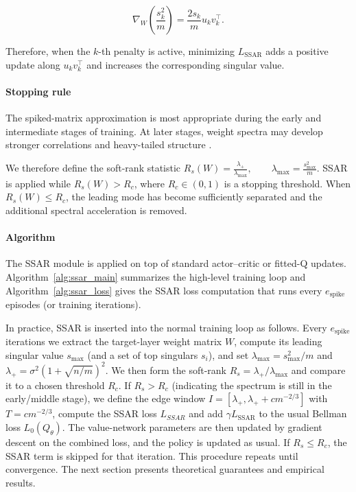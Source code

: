 \begin{equation}
\nabla_W
\left(
\frac{s_k^2}{m}
\right)
=
\frac{2s_k}{m}
u_kv_k^\top.
\end{equation}

Therefore, when the $k$-th penalty is active, minimizing
$L_{\mathrm{SSAR}}$ adds a positive update along $u_kv_k^\top$ and increases
the corresponding singular value.



\paragraph{Stopping rule}
The spiked-matrix approximation is most appropriate during the early and
intermediate stages of training. At later stages, weight spectra may develop
stronger correlations and heavy-tailed structure
\cite{martin2021implicit}.

We therefore define the soft-rank statistic $R_s(W)
=
\frac{\lambda_+}{\lambda_{\max}},
\qquad
\lambda_{\max}
=
\frac{s_{\max}^2}{m}$. SSAR is applied while $R_s(W)>R_c$, where $R_c\in(0,1)$ is a stopping threshold.
When $R_s(W)\leq R_c$, the leading mode has become sufficiently separated and the additional spectral acceleration is removed.

\paragraph{Algorithm}
The SSAR module is applied on top of standard actor–critic or fitted-Q updates. Algorithm~\ref{alg:ssar_main} summarizes the high-level training loop and Algorithm~\ref{alg:ssar_loss} gives the SSAR loss computation that runs every $e_{\mathrm{spike}}$ episodes (or training iterations).


In practice, SSAR is inserted into the normal training loop as follows. Every $e_{\mathrm{spike}}$ iterations we extract the target-layer weight matrix $W$, compute its leading singular value $s_{\max}$ (and a set of top singulars $s_i$), and set $\lambda_{\max}=s_{\max}^2/m$ and $\lambda_+=\sigma^2(1+\sqrt{n/m})^2$. We then form the soft-rank $R_s=\lambda_+/\lambda_{\max}$ and compare it to a chosen threshold $R_c$. If $R_s>R_c$ (indicating the spectrum is still in the early/middle stage), we define the edge window $I=[\lambda_+,\lambda_++cm^{-2/3}]$ with $T=cm^{-2/3}$, compute the SSAR loss $L_{SSAR}$ and add $\gamma L_{\mathrm{SSAR}}$ to the usual Bellman loss $L_0(Q_\theta)$. The value-network parameters are then updated by gradient descent on the combined loss, and the policy is updated as usual. If $R_s\le R_c$, the SSAR term is skipped for that iteration. This procedure repeats until convergence. The next section presents theoretical guarantees and empirical results.





